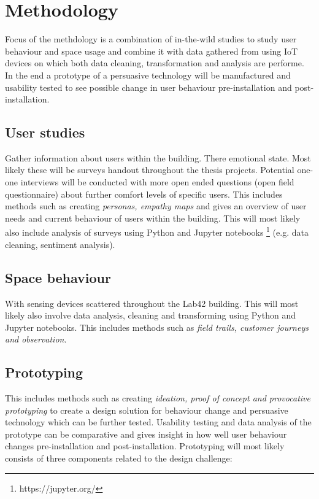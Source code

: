 \section{Methodology}

Focus of the methdology is a combination of in-the-wild studies to study user behaviour and space usage and combine it with data gathered from using IoT devices on which both data cleaning, transformation and analysis are performe. In the end a prototype of a persuasive technology will be manufactured and usability tested to see possible change in user behaviour pre-installation and post-installation.

\subsection{User studies}

Gather information about users within the building. There emotional state. Most likely these will be surveys handout throughout the thesis projects. Potential one-one interviews will be conducted with more open ended questions (open field questionnaire) about further comfort levels of specific users. This includes methods such as creating \emph{personas, empathy maps} and gives an overview of user needs and current behaviour of users within the building. This will most likely also include analysis of surveys using Python and Jupyter notebooks \footnote{https://jupyter.org/} (e.g. data cleaning, sentiment analysis).

\subsection{Space behaviour}

With sensing devices scattered throughout the Lab42 building. This will most likely also involve data analysis, cleaning and transforming using Python and Jupyter notebooks. This includes methods such as \emph{field trails, customer journeys and observation}.

\subsection{Prototyping}

This includes methods such as creating \emph{ideation, proof of concept and provocative prototyping} to create a design solution for behaviour change and persuasive technology which can be further tested. Usability testing and data analysis of the prototype can be comparative and gives insight in how well user behaviour changes pre-installation and post-installation. Prototyping will most likely consists of three components related to the design challenge: 

